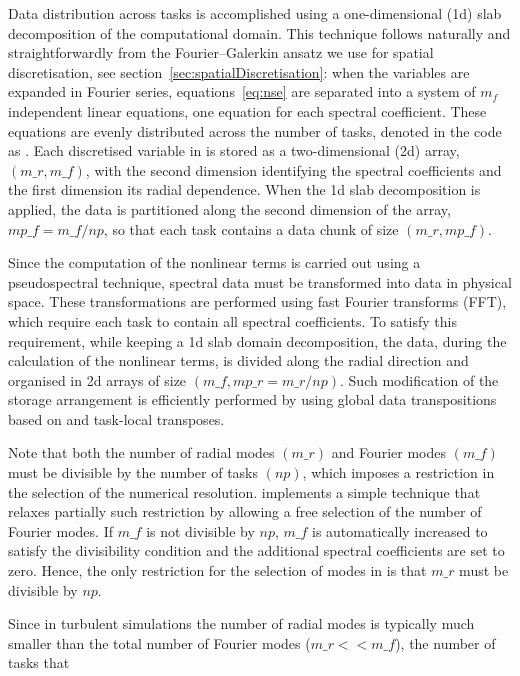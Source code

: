 \documentclass[a4paper, 11pt, DIV=11]{scrartcl}
\begin{document}
Data distribution across \mpi tasks is accomplished using a one-dimensional (1d)
slab decomposition of the computational domain. This technique follows naturally and
straightforwardly from the Fourier--Galerkin ansatz we use for spatial discretisation,
see section~\ref{sec:spatialDiscretisation}: when the variables are expanded in Fourier
series, equations~\ref{eq:nse} are separated into a system of $m_f$ independent linear
equations, \ie one equation for each spectral coefficient. These equations are evenly
distributed across the number of \mpi tasks, denoted in the code as . Each
discretised variable in \nsc is stored as a two-dimensional (2d) array, $(m\_r,m\_f)$,
with the second dimension identifying the spectral coefficients and the first dimension
its radial dependence. When the 1d slab decomposition is applied, the data is partitioned
along the second dimension of the array, $mp\_f = m\_f/np$, so that each \mpi task
contains a data chunk of size $(m\_r,mp\_f)$.
\par
Since the computation of the nonlinear terms is carried out using a pseudospectral
technique, spectral data must be transformed into data in physical space. These
transformations are performed using fast Fourier transforms (FFT), which require each
\mpi task to contain all spectral coefficients. To satisfy this requirement, while
keeping a 1d slab domain decomposition, the data, during the calculation of the nonlinear
terms, is divided along the radial direction and organised in 2d arrays of size
$(m\_f, mp\_r = m\_r/np)$. Such modification of the storage arrangement is efficiently
performed by using global data transpositions based on  and task-local
transposes.
\par
Note that both the number of radial modes $(m\_r)$ and Fourier modes $(m\_f)$ must
be divisible by the number of \mpi tasks $(np)$, which imposes a restriction in the
selection of the numerical resolution. \nsc implements a simple technique that relaxes
partially such restriction by allowing a free selection of the number of Fourier modes.
If $m\_f$ is not divisible by $np$, $m\_f$ is automatically increased to satisfy the
divisibility condition and the additional spectral coefficients are set to zero. Hence,
the only restriction for the selection of modes in \nsc is that $m\_r$ must be divisible
by $np$.
\par
Since in turbulent simulations the number of radial modes is typically much smaller
than the total number of Fourier modes ($m\_r << m\_f$), the number of \mpi tasks that
\end{document}
